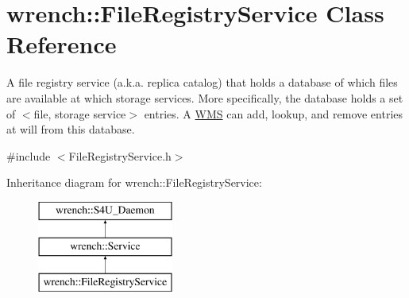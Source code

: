 \hypertarget{classwrench_1_1_file_registry_service}{}\section{wrench\+:\+:File\+Registry\+Service Class Reference}
\label{classwrench_1_1_file_registry_service}


A file registry service (a.\+k.\+a. replica catalog) that holds a database of which files are available at which storage services. More specifically, the database holds a set of $<$file, storage service$>$ entries. A \hyperlink{classwrench_1_1_w_m_s}{W\+MS} can add, lookup, and remove entries at will from this database.  




{\ttfamily \#include $<$File\+Registry\+Service.\+h$>$}

Inheritance diagram for wrench\+:\+:File\+Registry\+Service\+:\begin{figure}[H]
\begin{center}
\leavevmode
\includegraphics[height=3.000000cm]{classwrench_1_1_file_registry_service}
\end{center}
\end{figure}
